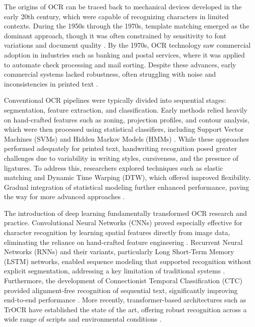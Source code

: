 The origins of OCR can be traced back to mechanical devices developed in the early 20th century, which were capable of recognizing characters in limited contexts. During the 1950s through the 1970s, template matching emerged as the dominant approach, though it was often constrained by sensitivity to font variations and document quality \cite{govindaraju1993handwritten}. By the 1970s, OCR technology saw commercial adoption in industries such as banking and postal services, where it was applied to automate check processing and mail sorting. Despite these advances, early commercial systems lacked robustness, often struggling with noise and inconsistencies in printed text \cite{mori1992historical}.

Conventional OCR pipelines were typically divided into sequential stages: segmentation, feature extraction, and classification. Early methods relied heavily on hand-crafted features such as zoning, projection profiles, and contour analysis, which were then processed using statistical classifiers, including Support Vector Machines (SVMs) and Hidden Markov Models (HMMs) \cite{casey1996survey}. While these approaches performed adequately for printed text, handwriting recognition posed greater challenges due to variability in writing styles, cursiveness, and the presence of ligatures. To address this, researchers explored techniques such as elastic matching and Dynamic Time Warping (DTW), which offered improved flexibility. Gradual integration of statistical modeling further enhanced performance, paving the way for more advanced approaches \cite{plamondon2000handwriting}.

The introduction of deep learning fundamentally transformed OCR research and practice. Convolutional Neural Networks (CNNs) proved especially effective for character recognition by learning spatial features directly from image data, eliminating the reliance on hand-crafted feature engineering \cite{lecun1998gradient}. Recurrent Neural Networks (RNNs) and their variants, particularly Long Short-Term Memory (LSTM) networks, enabled sequence modeling that supported recognition without explicit segmentation, addressing a key limitation of traditional systems \cite{graves2009novel}. Furthermore, the development of Connectionist Temporal Classification (CTC) provided alignment-free recognition of sequential text, significantly improving end-to-end performance \cite{graves2006ctc}. More recently, transformer-based architectures such as TrOCR have established the state of the art, offering robust recognition across a wide range of scripts and environmental conditions \cite{li2023trocr}.

